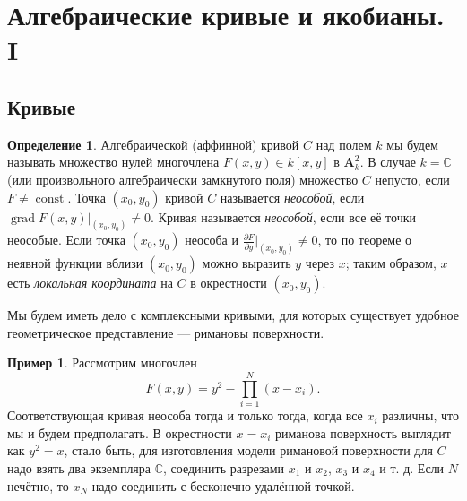 \documentclass{article}
\theoremstyle{definition}
\theoremstyle{definition} %
\newtheorem{definition}{Определение}[section]
\theoremstyle{remark}     %
\theoremstyle{definition}
\theoremstyle{definition}
\theoremstyle{definition}
\theoremstyle{definition}
\theoremstyle{definition}
\theoremstyle{definition}
\newtheorem*{example}{Пример}
\theoremstyle{definition}
\theoremstyle{definition}
\begin{document}
\section{Алгебраические кривые и якобианы. I}
\subsection{Кривые}
\begin{definition}
  Алгебраической (аффинной) кривой \(C\) над полем \(k\) мы будем называть множество нулей многочлена \(F(x, y) \in k[x, y]\) в \(\mathbf{A}_k^2\). В случае \(k = \mathbb{C}\) (или произвольного алгебраически замкнутого поля) множество \(C\) непусто, если \(F \neq \operatorname{const}\). Точка \((x_0, y_0)\) кривой \(C\) называется \textit{неособой}, если \(\operatorname{grad} F(x, y)|_{(x_0, y_0)} \neq 0\). Кривая называется \textit{неособой}, если все её точки неособые. Если точка \((x_0, y_0)\) неособа и \(\frac{\partial F}{\partial y}\big|_{(x_0, y_0)} \neq 0\), то по теореме о неявной функции вблизи \((x_0, y_0)\) можно выразить \(y\) через \(x\); таким образом, \(x\) есть \textit{локальная координата} на \(C\) в окрестности \((x_0, y_0)\).
\end{definition}


Мы будем иметь дело с комплексными кривыми, для которых существует удобное геометрическое представление — римановы поверхности.

\begin{example}
  Рассмотрим многочлен
  \[
    F(x, y) = y^2 - \prod_{i=1}^N (x - x_i).
  \]
  Соответствующая кривая неособа тогда и только тогда, когда все \(x_i\) различны, что мы и будем предполагать. В окрестности \(x = x_i\) риманова поверхность выглядит как \(y^2 = x\), стало быть, для изготовления модели римановой поверхности для \(C\) надо взять два экземпляра \(\mathbb{C}\), соединить разрезами \(x_1\) и \(x_2\), \(x_3\) и \(x_4\) и т. д. Если \(N\) нечётно, то \(x_N\) надо соединить с бесконечно удалённой точкой.
\end{example}


\begin{center}
\centering
{}
\end{center}
\end{document}
